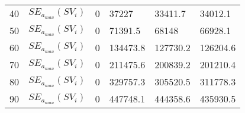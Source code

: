 \begin{table}[H]
\begin{tabular}{l l | l l | l l}
		40                                                          & $SE_{a_{max}}(SV_i)$                                                        & 0                                                                &   37227                                                              & 33411.7                                                          & 34012.1                                                                 \\
		50                                                          & $SE_{a_{max}}(SV_i)$                                                        & 0                                                                &    71391.5                                                                 & 68148                                                            & 66928.1                                                                 \\
		60                                                          & $SE_{a_{max}}(SV_i)$                                                        & 0                                                                &     134473.8                                                             & 127730.2                                                         & 126204.6                                                                \\
		70                                                          & $SE_{a_{max}}(SV_i)$                                                        & 0                                                                &   211475.6                                                                & 200839.2                                                         & 201210.4                                                                \\
		80                                                          & $SE_{a_{max}}(SV_i)$                                                        & 0                                                                &  329757.3                                                             & 305520.5                                                         & 311778.3                                                                \\
		90                                                          & $SE_{a_{max}}(SV_i)$                                                        & 0                                                                &    447748.1                                                            & 444358.6                                                         & 435930.5                                                                \\

\end{tabular}
\end{table}

